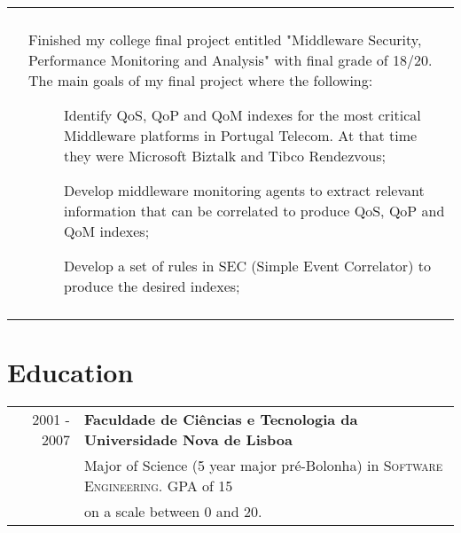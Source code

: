\documentclass[a4paper,10pt]{article}
\begin{document}
\begin{tabular}{rp{11cm}}
\begin{compactitem}
   \end{compactitem}\vspace{-1em} \\
  & \begin{compactitem}
   \item Finished my college final project entitled "Middleware Security, Performance Monitoring and Analysis" with final grade of 18/20.
   The main goals of my final project where the following: 
   \begin{description}
		\item[] Identify QoS, QoP and QoM indexes for the most critical Middleware platforms in Portugal Telecom. At that time they were Microsoft Biztalk and Tibco Rendezvous;
   \end{description}
   \begin{description}
		\item[] Develop middleware monitoring agents to extract relevant information that can be correlated to produce QoS, QoP and QoM indexes;
   \end{description}
      \begin{description}
		\item[] Develop a set of rules in SEC (Simple Event Correlator) to produce the desired indexes;
   \end{description}
   \end{compactitem}\vspace{-1em} \\
\multicolumn{2}{c}{} \\

\end{tabular}

\section{Education}
\begin{tabular}{rl}	
2001 - 2007 & \textbf{Faculdade de Ciências e Tecnologia da Universidade Nova de Lisboa}\\
 & Major of Science (5 year major pré-Bolonha) in \textsc{Software Engineering}. GPA of 15\\
 & on a scale between 0 and 20. \\
\end{tabular}
\end{document}
